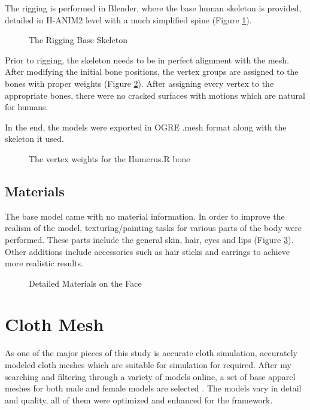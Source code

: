 The rigging is performed in Blender\cite{Blender}, where the base human skeleton is provided, detailed in H-ANIM2 level with a much simplified spine 
(Figure \ref{fig:rigging_skeleton}). 

\begin{figure}[h]
\centerline{}
\caption{The Rigging Base Skeleton}
\label{fig:rigging_skeleton}
\end{figure}

Prior to rigging, the skeleton needs to be in perfect alignment with the mesh. After modifying the initial bone positions, 
the vertex groups are assigned to the bones with proper weights (Figure \ref{fig:weight_humerus_r}).
 After assigning every vertex to the appropriate bones, there were no cracked surfaces with motions which are natural for humans. 

In the end, the models were exported in OGRE .mesh format along with the skeleton it used.

\begin{figure}[h]
\centerline{}
\caption{The vertex weights for the Humerus.R bone}
\label{fig:weight_humerus_r}
\end{figure}

\subsection{Materials}

The base model came with no material information. In order to improve the realism of the model, texturing/painting tasks for various parts of the body were performed.
 These parts include the general skin, hair, eyes and lips (Figure \ref{fig:detailed_face}). Other additions include accessories such as hair sticks and earrings
 to achieve more realistic results.

\begin{figure}[h]
\centerline{}
\caption{Detailed Materials on the Face}
\label{fig:detailed_face}
\end{figure}

\section{Cloth Mesh}
\label{section_cloth_mesh}

As one of the major pieces of this study is accurate cloth simulation, accurately modeled cloth meshes which are suitable for simulation for required. 
After my searching and filtering through a variety of models online, a set of base apparel meshes for both male and female models are selected \cite{LadyJewell2012,
3dregenerator2013,Axel2013,Borodin2013,PS3D2013,Alperin2013}. The models vary in detail and quality, all of them were optimized and enhanced for the framework. 

